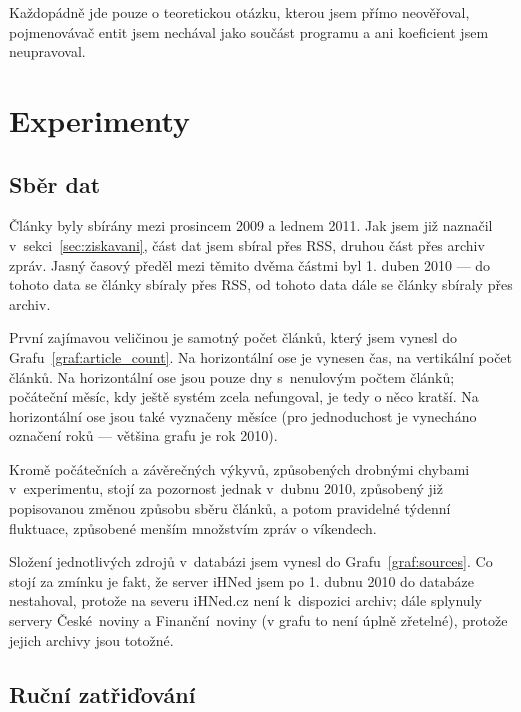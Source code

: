 \documentclass[12pt,a4paper]{report}
\begin{document}
Každopádně jde pouze o teoretickou otázku, kterou jsem přímo neověřoval, pojmenovávač entit jsem nechával jako součást programu a ani koeficient jsem neupravoval.


\chapter{Experimenty}
\label{sec:experimenty}


\section {Sběr dat}
\label{sec:sberdat}

Články byly sbírány mezi prosincem 2009 a lednem 2011. Jak jsem již naznačil v~sekci~\ref{sec:ziskavani}, část dat jsem sbíral přes RSS, druhou část přes archiv zpráv. Jasný časový předěl mezi těmito dvěma částmi byl 1. duben 2010 --- do tohoto data se články sbíraly přes RSS, od tohoto data dále se články sbíraly přes archiv.


První zajímavou veličinou je samotný počet článků, který jsem vynesl do Grafu~\ref{graf:article_count}. Na horizontální ose je vynesen čas, na vertikální počet článků. Na horizontální ose jsou pouze dny s~nenulovým počtem článků; počáteční měsíc, kdy ještě systém zcela nefungoval, je tedy o něco kratší. Na horizontální ose jsou také vyznačeny měsíce (pro jednoduchost je vynecháno označení roků --- většina grafu je rok 2010).

Kromě počátečních a závěrečných výkyvů, způsobených drobnými chybami v~experimentu, stojí za pozornost jednak  v~dubnu 2010, způsobený již popisovanou změnou způsobu sběru článků, a potom pravidelné týdenní fluktuace, způsobené menším množstvím zpráv o víkendech.


Složení jednotlivých zdrojů v~databázi jsem vynesl do Grafu~\ref{graf:sources}. Co stojí za zmínku je fakt, že server iHNed jsem po 1. dubnu 2010 do databáze nestahoval, protože na severu iHNed.cz není k~dispozici archiv; dále splynuly servery České~noviny a Finanční~noviny (v grafu to není úplně zřetelné), protože jejich archivy jsou totožné.

\section{Ruční zatřiďování}
\label{sec:rucnik}
\end{document}
